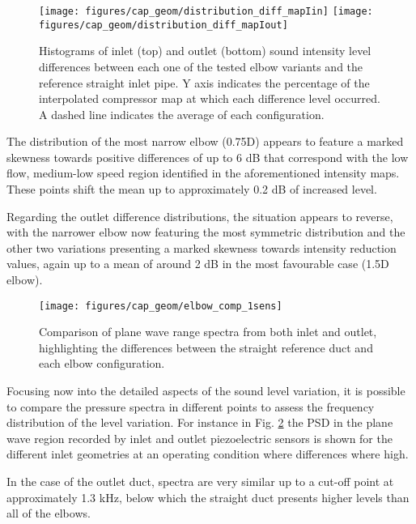 \begin{figure}[htb!]
\centering
\texttt{[image: figures/cap\_geom/distribution\_diff\_mapIin]}
\texttt{[image: figures/cap\_geom/distribution\_diff\_mapIout]}
\caption[Difference histograms for SIL]{Histograms of inlet (top) and outlet (bottom) sound intensity level differences between each one of the tested elbow variants and the reference straight inlet pipe. Y axis indicates the percentage of the interpolated compressor map at which each difference level occurred. A dashed line indicates the average of each configuration.}
\label{fig:elbow_intens_histog}
\end{figure}

The distribution of the most narrow elbow (0.75D) appears to feature a marked skewness towards positive differences of up to 6 dB that correspond with the low flow, medium-low speed region identified in the aforementioned intensity maps. These points shift the mean up to approximately 0.2 dB of increased level.

Regarding the outlet difference distributions, the situation appears to reverse, with the narrower elbow now featuring the most symmetric distribution and the other two variations presenting a marked skewness towards intensity reduction values, again up to a mean of around 2 dB in the most favourable case (1.5D elbow).

\begin{figure}[htb!]
\centering
\texttt{[image: figures/cap\_geom/elbow\_comp\_1sens]}
\caption[Comparison of plane wave range spectra]{Comparison of plane wave range spectra from both inlet and outlet, highlighting the differences between the straight reference duct and each elbow configuration.}
\label{fig:elbow_comp_1sens}
\end{figure}

Focusing now into the detailed aspects of the sound level variation, it is possible to compare the pressure spectra in different points to assess the frequency distribution of the level variation. For instance in Fig. \ref{fig:elbow_comp_1sens} the PSD in the plane wave region recorded by inlet and outlet piezoelectric sensors is shown for the different inlet geometries at an operating condition where differences where high.

In the case of the outlet duct, spectra are very similar up to a cut-off point at approximately 1.3 kHz, below which the straight duct presents higher levels than all of the elbows.

